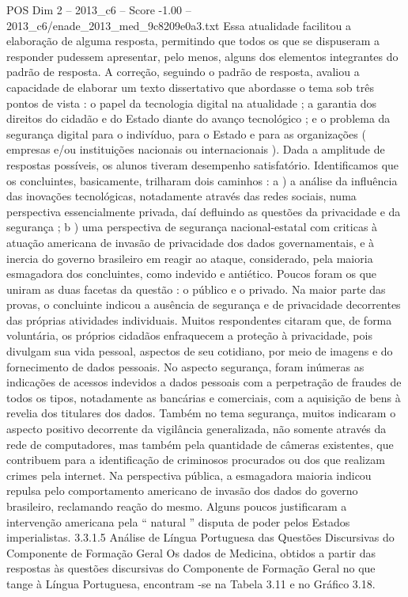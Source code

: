 \begin{textsample}{POS Dim 2 – 2013\_c6 – Score -1.00 – 2013\_c6/enade\_2013\_med\_9c8209e0a3.txt}
Essa atualidade facilitou a elaboração de alguma resposta, permitindo que todos os que se dispuseram a responder pudessem apresentar, pelo menos, alguns dos elementos integrantes do padrão de resposta.
A correção, seguindo o padrão de resposta, avaliou a capacidade de elaborar um texto dissertativo que abordasse o tema sob três pontos de vista : o papel da tecnologia digital na atualidade ; a garantia dos direitos do cidadão e do Estado diante do avanço tecnológico ; e o problema da segurança digital para o indivíduo, para o Estado e para as organizações ( empresas e/ou instituições nacionais ou internacionais ).
Dada a amplitude de respostas possíveis, os alunos tiveram desempenho satisfatório.
Identificamos que os concluintes, basicamente, trilharam dois caminhos : a ) a análise da influência das inovações tecnológicas, notadamente através das redes sociais, numa perspectiva essencialmente privada, daí defluindo as questões da privacidade e da segurança ; b ) uma perspectiva de segurança nacional-estatal com criticas à atuação americana de invasão de privacidade dos dados governamentais, e à inercia do governo brasileiro em reagir ao ataque, considerado, pela maioria esmagadora dos concluintes, como indevido e antiético.
Poucos foram os que uniram as duas facetas da questão : o público e o privado.
Na maior parte das provas, o concluinte indicou a ausência de segurança e de privacidade decorrentes das próprias atividades individuais.
Muitos respondentes citaram que, de forma voluntária, os próprios cidadãos enfraquecem a proteção à privacidade, pois divulgam sua vida pessoal, aspectos de seu cotidiano, por meio de imagens e do fornecimento de dados pessoais.
No aspecto segurança, foram inúmeras as indicações de acessos indevidos a dados pessoais com a perpetração de fraudes de todos os tipos, notadamente as bancárias e comerciais, com a aquisição de bens à revelia dos titulares dos dados.
Também no tema segurança, muitos indicaram o aspecto positivo decorrente da vigilância generalizada, não somente através da rede de computadores, mas também pela quantidade de câmeras existentes, que contribuem para a identificação de criminosos procurados ou dos que realizam crimes pela internet.
Na perspectiva pública, a esmagadora maioria indicou repulsa pelo comportamento americano de invasão dos dados do governo brasileiro, reclamando reação do mesmo.
Alguns poucos justificaram a intervenção americana pela “ natural ” disputa de poder pelos Estados imperialistas. 3.3.1.5 Análise de Língua Portuguesa das Questões Discursivas do Componente de Formação Geral Os dados de Medicina, obtidos a partir das respostas às questões discursivas do Componente de Formação Geral no que tange à Língua Portuguesa, encontram -se na Tabela 3.11 e no Gráfico 3.18.

\end{textsample}
